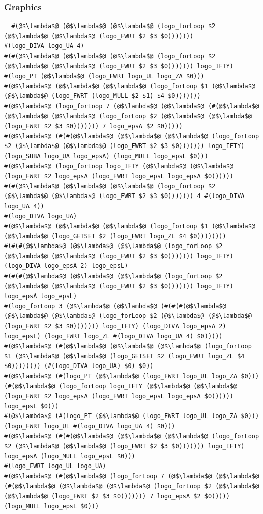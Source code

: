 \documentclass{article}
\begin{document}
\subsubsection{Graphics}
\begin{lstlisting}
  #(@$\lambda$@ (@$\lambda$@ (@$\lambda$@ (logo_forLoop $2 (@$\lambda$@ (@$\lambda$@ (logo_FWRT $2 $3 $0)))))))
#(logo_DIVA logo_UA 4)
#(#(@$\lambda$@ (@$\lambda$@ (@$\lambda$@ (logo_forLoop $2 (@$\lambda$@ (@$\lambda$@ (logo_FWRT $2 $3 $0))))))) logo_IFTY)
#(logo_PT (@$\lambda$@ (logo_FWRT logo_UL logo_ZA $0)))
#(@$\lambda$@ (@$\lambda$@ (@$\lambda$@ (logo_forLoop $1 (@$\lambda$@ (@$\lambda$@ (logo_FWRT (logo_MULL $2 $1) $4 $0)))))))
#(@$\lambda$@ (logo_forLoop 7 (@$\lambda$@ (@$\lambda$@ (#(@$\lambda$@ (@$\lambda$@ (@$\lambda$@ (logo_forLoop $2 (@$\lambda$@ (@$\lambda$@ (logo_FWRT $2 $3 $0))))))) 7 logo_epsA $2 $0)))))
#(@$\lambda$@ (#(#(@$\lambda$@ (@$\lambda$@ (@$\lambda$@ (logo_forLoop $2 (@$\lambda$@ (@$\lambda$@ (logo_FWRT $2 $3 $0))))))) logo_IFTY) (logo_SUBA logo_UA logo_epsA) (logo_MULL logo_epsL $0)))
#(@$\lambda$@ (logo_forLoop logo_IFTY (@$\lambda$@ (@$\lambda$@ (logo_FWRT $2 logo_epsA (logo_FWRT logo_epsL logo_epsA $0))))))
#(#(@$\lambda$@ (@$\lambda$@ (@$\lambda$@ (logo_forLoop $2 (@$\lambda$@ (@$\lambda$@ (logo_FWRT $2 $3 $0))))))) 4 #(logo_DIVA logo_UA 4))
#(logo_DIVA logo_UA)
#(@$\lambda$@ (@$\lambda$@ (@$\lambda$@ (logo_forLoop $1 (@$\lambda$@ (@$\lambda$@ (logo_GETSET $2 (logo_FWRT logo_ZL $4 $0))))))))
#(#(#(@$\lambda$@ (@$\lambda$@ (@$\lambda$@ (logo_forLoop $2 (@$\lambda$@ (@$\lambda$@ (logo_FWRT $2 $3 $0))))))) logo_IFTY) (logo_DIVA logo_epsA 2) logo_epsL)
#(#(#(@$\lambda$@ (@$\lambda$@ (@$\lambda$@ (logo_forLoop $2 (@$\lambda$@ (@$\lambda$@ (logo_FWRT $2 $3 $0))))))) logo_IFTY) logo_epsA logo_epsL)
#(logo_forLoop 3 (@$\lambda$@ (@$\lambda$@ (#(#(#(@$\lambda$@ (@$\lambda$@ (@$\lambda$@ (logo_forLoop $2 (@$\lambda$@ (@$\lambda$@ (logo_FWRT $2 $3 $0))))))) logo_IFTY) (logo_DIVA logo_epsA 2) logo_epsL) (logo_FWRT logo_ZL #(logo_DIVA logo_UA 4) $0)))))
#(@$\lambda$@ (#(@$\lambda$@ (@$\lambda$@ (@$\lambda$@ (logo_forLoop $1 (@$\lambda$@ (@$\lambda$@ (logo_GETSET $2 (logo_FWRT logo_ZL $4 $0)))))))) (#(logo_DIVA logo_UA) $0) $0))
#(@$\lambda$@ (#(logo_PT (@$\lambda$@ (logo_FWRT logo_UL logo_ZA $0))) (#(@$\lambda$@ (logo_forLoop logo_IFTY (@$\lambda$@ (@$\lambda$@ (logo_FWRT $2 logo_epsA (logo_FWRT logo_epsL logo_epsA $0)))))) logo_epsL $0)))
#(@$\lambda$@ (#(logo_PT (@$\lambda$@ (logo_FWRT logo_UL logo_ZA $0))) (logo_FWRT logo_UL #(logo_DIVA logo_UA 4) $0)))
#(@$\lambda$@ (#(#(@$\lambda$@ (@$\lambda$@ (@$\lambda$@ (logo_forLoop $2 (@$\lambda$@ (@$\lambda$@ (logo_FWRT $2 $3 $0))))))) logo_IFTY) logo_epsA (logo_MULL logo_epsL $0)))
#(logo_FWRT logo_UL logo_UA)
#(@$\lambda$@ (#(@$\lambda$@ (logo_forLoop 7 (@$\lambda$@ (@$\lambda$@ (#(@$\lambda$@ (@$\lambda$@ (@$\lambda$@ (logo_forLoop $2 (@$\lambda$@ (@$\lambda$@ (logo_FWRT $2 $3 $0))))))) 7 logo_epsA $2 $0))))) (logo_MULL logo_epsL $0)))
\end{lstlisting}
\end{document}
